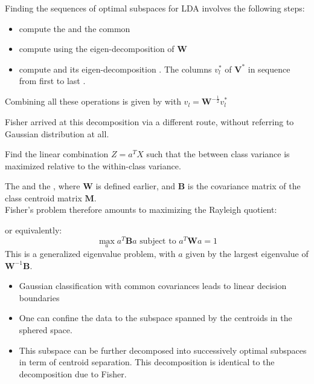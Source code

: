 Finding the sequences of optimal subspaces for LDA involves the following steps:
\begin{itemize}
	\item compute the  and the common
	\item compute  using the eigen-decomposition 
		of $\bm{W}$
	\item compute  and its 
		eigen-decomposition .
		The columns $v_{l}^{*}$ of $\bm{V}^{*}$ in sequence from first to last .
\end{itemize}
Combining all these operations  is given by  with $v_{l}=\bm{W}^{-\frac{1}{2}}v_{l}^{*}$

Fisher arrived at this decomposition via a different route, without referring to Gaussian 
distribution at all.
\begin{center}
	Find the linear combination $Z=a^{T}X$ such that the between class variance is maximized
	relative to the within-class variance.
\end{center}

The  and the , where $\bm{W}$ is defined earlier, and $\bm{B}$ is the covariance matrix of the class centroid matrix
$\bm{M}$.\\
Fisher's problem therefore amounts to maximizing the Rayleigh quotient:
\begin{center}
\end{center}
or equivalently:
$$ \max\limits_{a}a^{T}\bm{B}a \text{ subject to } a^{T}\bm{W}a=1$$
This is a generalized eigenvalue problem, with $a$ given by the largest eigenvalue of $\bm{W}^{-1}
\bm{B}$. 
\begin{itemize}
	\item Gaussian classification with common covariances leads to linear decision boundaries
	\item One can confine the data to the subspace spanned by the centroids in the sphered
		space.
	\item This subspace can be further decomposed into successively optimal subspaces in 
		term of centroid separation. This decomposition is identical to the decomposition
		due to Fisher.
\end{itemize}

